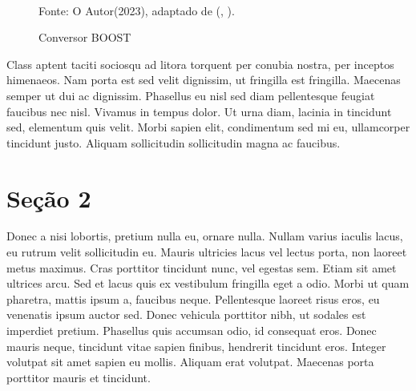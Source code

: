 {\begin{figure}[h!]
  \caption{Conversor BOOST}
\begin{center}
\\
  {\footnotesize Fonte: O Autor(2023), adaptado de (\citeauthor{hart2016eletronica}, \citeyear{hart2016eletronica}).}  %
  \label{6.8a.eps}
\end{center}
\end{figure}

Class aptent taciti sociosqu ad litora torquent per conubia nostra, per inceptos himenaeos. Nam porta est sed velit dignissim, ut fringilla est fringilla. Maecenas semper ut dui ac dignissim. Phasellus eu nisl sed diam pellentesque feugiat faucibus nec nisl. Vivamus in tempus dolor. Ut urna diam, lacinia in tincidunt sed, elementum quis velit. Morbi sapien elit, condimentum sed mi eu, ullamcorper tincidunt justo. Aliquam sollicitudin sollicitudin magna ac faucibus.


\section{Seção 2}\label{Seção 22}
Donec a nisi lobortis, pretium nulla eu, ornare nulla. Nullam varius iaculis lacus, eu rutrum velit sollicitudin eu. Mauris ultricies lacus vel lectus porta, non laoreet metus maximus. Cras porttitor tincidunt nunc, vel egestas sem. Etiam sit amet ultrices arcu. Sed et lacus quis ex vestibulum fringilla eget a odio. Morbi ut quam pharetra, mattis ipsum a, faucibus neque. Pellentesque laoreet risus eros, eu venenatis ipsum auctor sed. Donec vehicula porttitor nibh, ut sodales est imperdiet pretium. Phasellus quis accumsan odio, id consequat eros. Donec mauris neque, tincidunt vitae sapien finibus, hendrerit tincidunt eros. Integer volutpat sit amet sapien eu mollis. Aliquam erat volutpat. Maecenas porta porttitor mauris et tincidunt.

}
